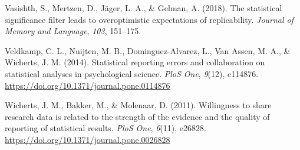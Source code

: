 \documentclass[
  doc,
  longtable,
  nolmodern,
  notxfonts,
  notimes,
  colorlinks=true,linkcolor=blue,citecolor=blue,urlcolor=blue]{apa7}
\newlength{\cslhangindent}
\newenvironment{CSLReferences}[2] %
 {\begin{list}{}{%
  \setlength{\itemindent}{0pt}
  \setlength{\leftmargin}{0pt}
  \setlength{\parsep}{0pt}
  \ifodd #1
   \setlength{\leftmargin}{\cslhangindent}
   \setlength{\itemindent}{-1\cslhangindent}
  \fi
  \setlength{\itemsep}{#2\baselineskip}}}
 {\end{list}}
\begin{document}
\begin{CSLReferences}{1}{0}
Vasishth, S., Mertzen, D., Jäger, L. A., \& Gelman, A. (2018). The
statistical significance filter leads to overoptimistic expectations of
replicability. \emph{Journal of Memory and Language}, \emph{103},
151--175.

Veldkamp, C. L., Nuijten, M. B., Dominguez-Alvarez, L., Van Assen, M.
A., \& Wicherts, J. M. (2014). Statistical reporting errors and
collaboration on statistical analyses in psychological science.
\emph{PloS One}, \emph{9}(12), e114876.
\url{https://doi.org/10.1371/journal.pone.0114876}

Wicherts, J. M., Bakker, M., \& Molenaar, D. (2011). Willingness to
share research data is related to the strength of the evidence and the
quality of reporting of statistical results. \emph{PloS One},
\emph{6}(11), e26828. \url{https://doi.org/10.1371/journal.pone.0026828}

\end{CSLReferences}
\end{document}
